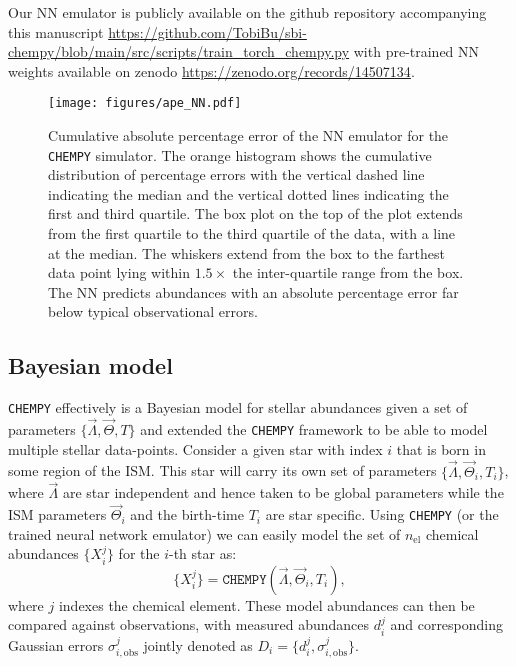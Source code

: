 \documentclass{aa}
\begin{document}
Our NN emulator is publicly available on the github repository accompanying this manuscript \href{https://github.com/TobiBu/sbi-chempy/blob/main/src/scripts/train_torch_chempy.py}{https://github.com/TobiBu/sbi-chempy/blob/main/src/scripts/train\_torch\_chempy.py} with pre-trained NN weights available on zenodo \href{https://zenodo.org/records/14507134}{https://zenodo.org/records/14507134}.

\begin{figure}[]
     \centering
     \texttt{[image: figures/ape\_NN.pdf]}
     \vspace{-.5cm}
     \caption{Cumulative absolute percentage error of the NN emulator for the \texttt{CHEMPY} simulator. The orange histogram shows the cumulative distribution of percentage errors with the vertical dashed line indicating the median and the vertical dotted lines indicating the first and third quartile. The box plot on the top of the plot extends from the first quartile to the third quartile of the data, with a line at the median. The whiskers extend from the box to the farthest data point lying within $1.5\times$ the inter-quartile range from the box. The NN predicts abundances with an absolute percentage error far below typical observational errors.}
     \label{fig:ape_NN}
\end{figure}


\subsection{Bayesian model}
\texttt{CHEMPY} effectively is a Bayesian model for stellar abundances given a set of parameters $\{\Vec{\Lambda},\Vec{\Theta},T\}$ and \citet{Philcox_2019} extended the \texttt{CHEMPY} framework to be able to model multiple stellar data-points. Consider a given star with index $i$ that is born in some region of the ISM. This star will carry its own set of parameters $\{\Vec{\Lambda},\Vec{\Theta}_i,T_i\}$, where $\Vec{\Lambda}$ are star independent and hence taken to be global parameters while the ISM parameters $\Vec{\Theta}_i$ and the birth-time $T_i$ are star specific. Using \texttt{CHEMPY} (or the trained neural network emulator) we can easily model the set of $n_\mathrm{el}$ chemical abundances $\{X_i^j\}$ for the $i$-th star as: 
\begin{equation}\label{eq:chempy_function}
\{X_i^j\} = \texttt{CHEMPY}(\Vec{\Lambda},\Vec{\Theta}_i,T_i),
\end{equation}
where $j$ indexes the chemical element. 
These model abundances can then be compared against observations, with measured abundances $d_i^j$ and corresponding Gaussian errors $\sigma_{i,\mathrm{obs}}^j$ jointly denoted as $D_i=\{d_i^j,\sigma_{i,\mathrm{obs}}^j\}$.
\end{document}

